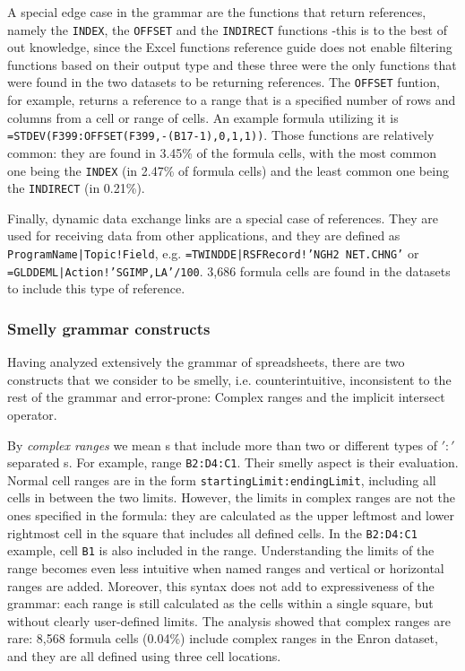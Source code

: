\documentclass[conference]{IEEEtran}
\begin{document}
A special edge case in the grammar are the functions that return references, namely the \texttt{INDEX}, the \texttt{OFFSET} and the \texttt{INDIRECT} functions -this is to the best of out knowledge, since the Excel functions reference guide does not enable filtering functions based on their output type and these three were the only functions that were found in the two datasets to be returning references. The \texttt{OFFSET} funtion, for example, returns a reference to a range that is a specified number of rows and columns from a cell or range of cells. An example formula utilizing it is \texttt{=STDEV(F399:OFFSET(F399,-(B17-1),0,1,1))}. Those functions are relatively common: they are found in 3.45\% of the formula cells, with the most common one being the \texttt{INDEX} (in 2.47\% of formula cells) and the least common one being the \texttt{INDIRECT} (in 0.21\%).

Finally, dynamic data exchange links are a special case of references. They are used for receiving data from other applications, and they are defined as \texttt{ProgramName|Topic!Field}, e.g. \texttt{=TWINDDE|RSFRecord!'NGH2 NET.CHNG'} or \texttt{=GLDDEML|Action!'SGIMP,LA'/100}. 3,686 formula cells are found in the datasets to include this type of reference.

\subsubsection{Smelly grammar constructs}
Having analyzed extensively the grammar of spreadsheets, there are two constructs that we consider to be smelly, i.e. counterintuitive, inconsistent to the rest of the grammar and error-prone: Complex ranges and the implicit intersect operator.

By \textit{complex ranges} we mean s that include more than two or different types of $':'$ separated s. For example, range \texttt{B2:D4:C1}. Their smelly aspect is their evaluation. Normal cell ranges are in the form \texttt{startingLimit:endingLimit}, including all cells in between the two limits. However, the limits in complex ranges are not the ones specified in the formula: they are calculated as the upper leftmost and lower rightmost cell in the square that includes all defined cells. In the \texttt{B2:D4:C1} example, cell \texttt{B1} is also included in the range. Understanding the limits of the range becomes even less intuitive when named ranges and vertical or horizontal ranges are added. Moreover, this syntax does not add to expressiveness of the grammar: each range is still calculated as the cells within a single square, but without clearly user-defined limits. The analysis showed that complex ranges are rare: 8,568 formula cells	(0.04\%) include complex ranges in the Enron dataset, and they are all defined using three cell locations. 
\end{document}

